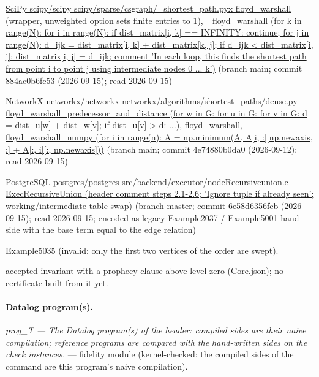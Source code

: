 \documentclass[10pt]{article}
\begin{document}
\begin{description}[leftmargin=2.6cm,style=nextline,itemsep=1pt]
\item[Sources] {\raggedright \href{https://github.com/scipy/scipy/blob/main/scipy/sparse/csgraph/_shortest_path.pyx}{SciPy scipy/scipy scipy/sparse/csgraph/\_shortest\_path.pyx floyd\_warshall (wrapper, unweighted option sets finite entries to 1), \_floyd\_warshall (for k in range(N): for i in range(N): if dist\_matrix[i, k] == INFINITY: continue; for j in range(N): d\_ijk = dist\_matrix[i, k] + dist\_matrix[k, j]; if d\_ijk \textless{} dist\_matrix[i, j]: dist\_matrix[i, j] = d\_ijk; comment 'In each loop, this finds the shortest path from point i to point j using intermediate nodes 0 ... k')} (branch main; commit 884ac0b6fc53 (2026-09-15); read 2026-09-15) \par \href{https://github.com/networkx/networkx/blob/main/networkx/algorithms/shortest_paths/dense.py}{NetworkX networkx/networkx networkx/algorithms/shortest\_paths/dense.py floyd\_warshall\_predecessor\_and\_distance (for w in G: for u in G: for v in G: d = dist\_u[w] + dist\_w[v]; if dist\_u[v] \textgreater{} d: ...), floyd\_warshall, floyd\_warshall\_numpy (for i in range(n): A = np.minimum(A, A[i, :][np.newaxis, :] + A[:, i][:, np.newaxis]))} (branch main; commit 4e74880b0da0 (2026-09-12); read 2026-09-15) \par \href{https://github.com/postgres/postgres/blob/master/src/backend/executor/nodeRecursiveunion.c}{PostgreSQL postgres/postgres src/backend/executor/nodeRecursiveunion.c ExecRecursiveUnion (header comment steps 2.1-2.6; 'Ignore tuple if already seen'; working/intermediate table swap)} (branch master; commit 6e58d6356fcb (2026-09-15); read 2026-09-15; encoded as legacy Example2037 / Example5001 hand side with the base term equal to the edge relation)\par}

\item[Twin] Example5035 (invalid: only the first two vertices of the order are swept).

\item[Prophecy] accepted invariant with a prophecy clause above level zero (Core.json); no certificate built from it yet.

\end{description}

\paragraph{Datalog program(s).}

{\raggedright\textit{prog\_T --- The Datalog program(s) of the header: compiled sides are their naive compilation; reference programs are compared with the hand-written sides on the check instances.} --- fidelity module (kernel-checked: the compiled sides of the command are this program's naive compilation).\par}
\end{document}
